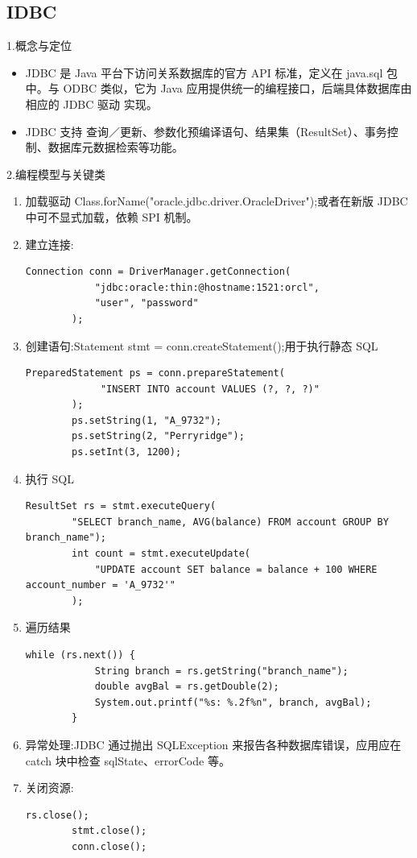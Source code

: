 \subsection{IDBC}

1.概念与定位

\begin{itemize}
    \item JDBC 是 Java 平台下访问关系数据库的官方 API 标准，定义在 java.sql 包中。与 ODBC 类似，它为 Java 应用提供统一的编程接口，后端具体数据库由相应的 JDBC 驱动 实现。
    \item JDBC 支持 查询／更新、参数化预编译语句、结果集（ResultSet）、事务控制、数据库元数据检索等功能。
\end{itemize}

2.编程模型与关键类

\begin{enumerate}
    \item 加载驱动 Class.forName("oracle.jdbc.driver.OracleDriver");或者在新版 JDBC 中可不显式加载，依赖 SPI 机制。
    \item 建立连接:
       \begin{lstlisting}[style=javastyle]
        Connection conn = DriverManager.getConnection(
            "jdbc:oracle:thin:@hostname:1521:orcl",
            "user", "password"
        );  
       \end{lstlisting}  
    \item 创建语句:Statement stmt = conn.createStatement();用于执行静态 SQL
      \begin{lstlisting}[style=javastyle]
        PreparedStatement ps = conn.prepareStatement(
             "INSERT INTO account VALUES (?, ?, ?)"
        );
        ps.setString(1, "A_9732");
        ps.setString(2, "Perryridge");
        ps.setInt(3, 1200);
      \end{lstlisting}
    \item 执行 SQL
       \begin{lstlisting}[style=javastyle]
        ResultSet rs = stmt.executeQuery(
        "SELECT branch_name, AVG(balance) FROM account GROUP BY branch_name");
        int count = stmt.executeUpdate(
            "UPDATE account SET balance = balance + 100 WHERE account_number = 'A_9732'"
        );
       \end{lstlisting}
    \item 遍历结果
       \begin{lstlisting}[style=javastyle]
        while (rs.next()) {
            String branch = rs.getString("branch_name");  
            double avgBal = rs.getDouble(2);
            System.out.printf("%s: %.2f%n", branch, avgBal);
        }        
       \end{lstlisting}
    \item 异常处理:JDBC 通过抛出 SQLException 来报告各种数据库错误，应用应在 catch 块中检查 sqlState、errorCode 等。
    \item 关闭资源:
       \begin{lstlisting}[style=javastyle]
        rs.close();
        stmt.close();
        conn.close();
       \end{lstlisting}
\end{enumerate}


